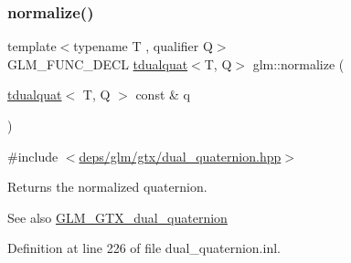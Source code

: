 \subsubsection{\texorpdfstring{normalize()}{normalize()}}
{\footnotesize\ttfamily template$<$typename T , qualifier Q$>$ \\
G\+L\+M\+\_\+\+F\+U\+N\+C\+\_\+\+D\+E\+CL \hyperlink{structglm_1_1tdualquat}{tdualquat}$<$T, Q$>$ glm\+::normalize (\begin{DoxyParamCaption}\item[{\hyperlink{structglm_1_1tdualquat}{tdualquat}$<$ T, Q $>$ const \&}]{q }\end{DoxyParamCaption})}



{\ttfamily \#include $<$\hyperlink{dual__quaternion_8hpp}{deps/glm/gtx/dual\+\_\+quaternion.\+hpp}$>$}

Returns the normalized quaternion.

\begin{DoxySeeAlso}{See also}
\hyperlink{group__gtx__dual__quaternion}{G\+L\+M\+\_\+\+G\+T\+X\+\_\+dual\+\_\+quaternion} 
\end{DoxySeeAlso}


Definition at line 226 of file dual\+\_\+quaternion.\+inl.

